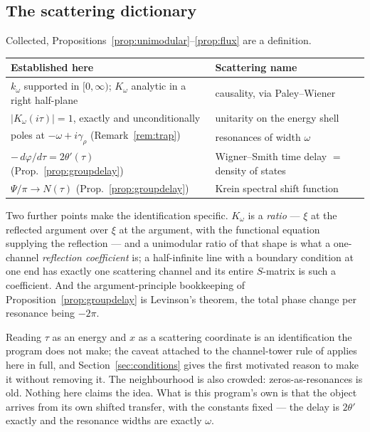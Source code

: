 \subsection{The scattering dictionary}

Collected, Propositions~\ref{prop:unimodular}--\ref{prop:flux} are a definition.

\begin{center}
\begin{tabular}{@{}p{}p{}@{}}
\toprule
Established here & Scattering name\\
\midrule
$k_\omega$ supported in $[0,\infty)$; $K_\omega$ analytic in a right half-plane &
causality, via Paley--Wiener\\
$|K_\omega(i\tau)|=1$, exactly and unconditionally &
unitarity on the energy shell\\
poles at $-\omega+i\gamma_\rho$ (Remark~\ref{rem:trap}) &
resonances of width $\omega$\\
$-\,d\varphi/d\tau=2\theta'(\tau)$ (Prop.~\ref{prop:groupdelay}) &
Wigner--Smith time delay $=$ density of states \cite{Smith}\\
$\Psi/\pi\to N(\tau)$ (Prop.~\ref{prop:groupdelay}) &
Krein spectral shift function \cite{BirmanKrein}\\
\bottomrule
\end{tabular}
\end{center}

Two further points make the identification specific. $K_\omega$ is a
\emph{ratio} --- $\xi$ at the reflected argument over $\xi$ at the argument, with
the functional equation supplying the reflection --- and a unimodular ratio of that
shape is what a one-channel \emph{reflection coefficient} is; a half-infinite line
with a boundary condition at one end has exactly one scattering channel and its
entire $S$-matrix is such a coefficient. And the argument-principle bookkeeping of
Proposition~\ref{prop:groupdelay} is Levinson's theorem, the total phase change
per resonance being $-2\pi$.

\begin{remark}\label{rem:scatteringscope}
Reading $\tau$ as an energy and $x$ as a scattering coordinate is an
identification the program does not make; the caveat attached to the channel-tower
rule of \cite{Selection} applies here in full, and Section~\ref{sec:conditions}
gives the first motivated reason to make it without removing it. The
neighbourhood is also crowded: zeros-as-resonances is old. Nothing here claims
the idea. What is this program's own is that the object arrives from its own
shifted transfer, with the constants fixed --- the delay is $2\theta'$ exactly and
the resonance widths are exactly $\omega$.
\end{remark}

